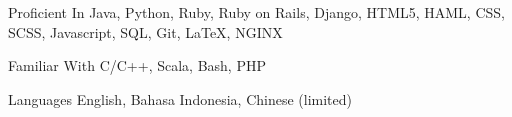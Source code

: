 


\begin{cvskills}


	\cvskill
	{Proficient In}
	{Java, Python, Ruby, Ruby on Rails, Django, HTML5, HAML, CSS, SCSS, Javascript, SQL, Git, LaTeX, NGINX}


	\cvskill
	{Familiar With}
	{C/C++, Scala, Bash, PHP}


	\cvskill
	{Languages}
	{English, Bahasa Indonesia, Chinese (limited)}


\end{cvskills}
